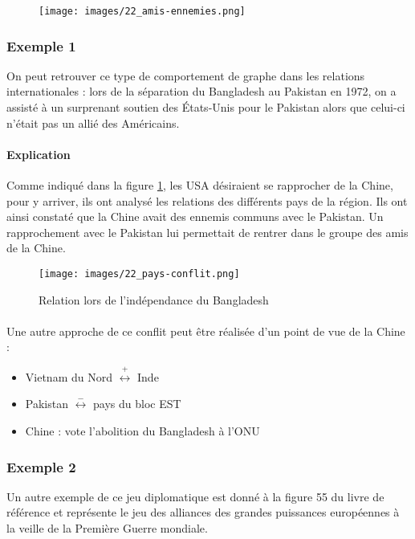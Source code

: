 \begin{figure}[!h]
	\centering
	\texttt{[image: images/22\_amis-ennemies.png]}
\end{figure}

\subsubsection*{Exemple 1}

On peut retrouver ce type de comportement de graphe dans les relations internationales : lors de la séparation du Bangladesh au Pakistan en 1972, on a assisté à un surprenant soutien des États-Unis pour le Pakistan alors que celui-ci n'était pas un allié des Américains. 
\paragraph{Explication} 
Comme indiqué dans la figure \ref{paysconflit}, les USA désiraient se rapprocher de la Chine, pour y arriver, ils ont analysé les relations des différents pays de la région. Ils ont ainsi constaté que la Chine avait des ennemis communs avec le Pakistan. Un rapprochement avec le Pakistan lui permettait de rentrer dans le groupe des amis de la Chine.


\begin{figure}[h!]
	\centering
	\texttt{[image: images/22\_pays-conflit.png]}
	\label{paysconflit}
	\caption{Relation lors de l'indépendance du Bangladesh}
\end{figure}

\paragraph{}
Une autre approche de ce conflit peut être réalisée d'un point de vue de la Chine : 

\begin{itemize}
	\item Vietnam du Nord $\overset{+}{\longleftrightarrow}$ Inde
	\item Pakistan $\overset{-}{\longleftrightarrow}$ pays du bloc EST
	\item Chine : vote l'abolition du Bangladesh à l'ONU
\end{itemize}

\subsubsection*{Exemple 2}
Un autre exemple de ce jeu diplomatique est donné à la figure 55 du livre de référence et représente le jeu des alliances des grandes puissances européennes à la veille de la Première Guerre mondiale.

